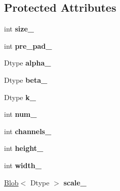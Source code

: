 \subsection*{Protected Attributes}
\begin{DoxyCompactItemize}
\item 
int {\bfseries size\+\_\+}\hypertarget{classcaffe_1_1LRNLayer_a4d74c3370e28abe013bf0fcc815fcc17}{}\label{classcaffe_1_1LRNLayer_a4d74c3370e28abe013bf0fcc815fcc17}

\item 
int {\bfseries pre\+\_\+pad\+\_\+}\hypertarget{classcaffe_1_1LRNLayer_a5d4a63f1279542a4fbe2780ba061f800}{}\label{classcaffe_1_1LRNLayer_a5d4a63f1279542a4fbe2780ba061f800}

\item 
Dtype {\bfseries alpha\+\_\+}\hypertarget{classcaffe_1_1LRNLayer_ae5a9eaf89e4082afe166f0fa7ee3b4ed}{}\label{classcaffe_1_1LRNLayer_ae5a9eaf89e4082afe166f0fa7ee3b4ed}

\item 
Dtype {\bfseries beta\+\_\+}\hypertarget{classcaffe_1_1LRNLayer_aa0765abb189bb6be067494ea5cc925f2}{}\label{classcaffe_1_1LRNLayer_aa0765abb189bb6be067494ea5cc925f2}

\item 
Dtype {\bfseries k\+\_\+}\hypertarget{classcaffe_1_1LRNLayer_a2fd6dd95ba02ae082bf5668305f19844}{}\label{classcaffe_1_1LRNLayer_a2fd6dd95ba02ae082bf5668305f19844}

\item 
int {\bfseries num\+\_\+}\hypertarget{classcaffe_1_1LRNLayer_ac68d88464a09f9deaf929908ffbaf345}{}\label{classcaffe_1_1LRNLayer_ac68d88464a09f9deaf929908ffbaf345}

\item 
int {\bfseries channels\+\_\+}\hypertarget{classcaffe_1_1LRNLayer_acd1bc62c5c9074c1df80f12d716f9a7a}{}\label{classcaffe_1_1LRNLayer_acd1bc62c5c9074c1df80f12d716f9a7a}

\item 
int {\bfseries height\+\_\+}\hypertarget{classcaffe_1_1LRNLayer_a9fa09286b061a99713b4268259fdaad7}{}\label{classcaffe_1_1LRNLayer_a9fa09286b061a99713b4268259fdaad7}

\item 
int {\bfseries width\+\_\+}\hypertarget{classcaffe_1_1LRNLayer_a5b12d5c779f16e9b1caf4c3a6d581e09}{}\label{classcaffe_1_1LRNLayer_a5b12d5c779f16e9b1caf4c3a6d581e09}

\item 
\hyperlink{classcaffe_1_1Blob}{Blob}$<$ Dtype $>$ {\bfseries scale\+\_\+}\hypertarget{classcaffe_1_1LRNLayer_a61a44943c15c502c557df755d8ef4c6c}{}\label{classcaffe_1_1LRNLayer_a61a44943c15c502c557df755d8ef4c6c}


\end{DoxyCompactItemize}
